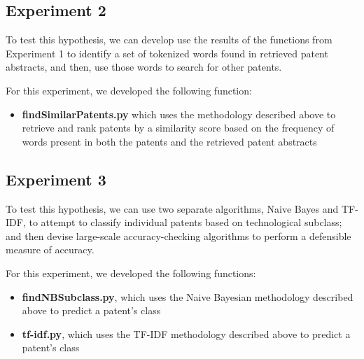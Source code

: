 \documentclass{article}
\begin{document}
\subsection{Experiment 2}
\noindent{}

To test this hypothesis, we can develop use the results of the functions from Experiment 1 to identify a set of tokenized words found in retrieved patent abstracts, and then, use those words to search for other patents.

For this experiment, we developed the following function:
\begin{itemize}
  \item \textbf{findSimilarPatents.py} which uses the methodology described above to retrieve and rank patents by a similarity score based on the frequency of words present in both the patents and the retrieved patent abstracts
\end{itemize}

\subsection{Experiment 3}
\noindent{}

To test this hypothesis, we can use two separate algorithms, Naive Bayes and TF-IDF, to attempt to classify individual patents based on technological subclass; and then devise large-scale accuracy-checking algorithms to perform a defensible measure of accuracy.

For this experiment, we developed the following functions:
\begin{itemize}
  \item \textbf{findNBSubclass.py}, which uses the Naive Bayesian methodology described above to predict a patent’s class
  \item \textbf{tf-idf.py}, which uses the TF-IDF methodology described above to predict a patent’s class
\end{itemize}
\end{document}

